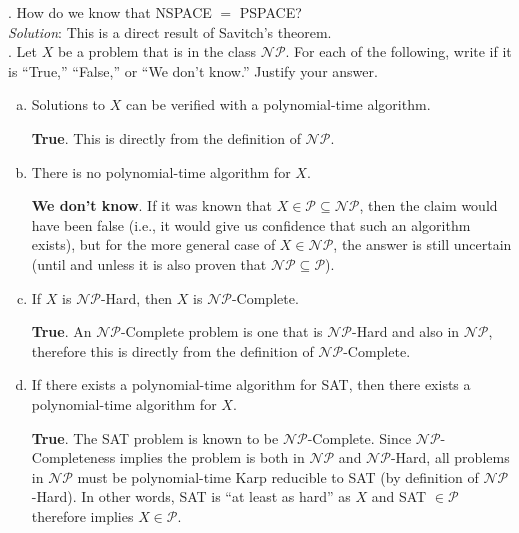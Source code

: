 \documentclass{scrartcl}
\begin{document}
    \bigskip
    . How do we know that \textsf{NSPACE $=$ PSPACE}?\\

    \noindent
    \textit{Solution}: This is a direct result of Savitch's theorem.\\

    \bigskip
    . Let $X$ be a problem that is in the class $\mathcal{NP}$. For each of the following, write if
    it is ``True,'' ``False,'' or ``We don't know.'' Justify your answer.
    \begin{enumerate}[(a)]
        \item Solutions to $X$ can be verified with a polynomial-time algorithm.

            \textbf{True}. This is directly from the definition of $\mathcal{NP}$.

        \item There is no polynomial-time algorithm for $X$.

            \textbf{We don't know}. If it was known that $X \in \mathcal{P} \subseteq \mathcal{NP}$,
            then the claim would have been false (i.e., it would give us confidence that such an
            algorithm exists), but for the more general case of $X \in \mathcal{NP}$, the answer is
            still uncertain (until and unless it is also proven that $\mathcal{NP} \subseteq
            \mathcal{P}$).

        \item If $X$ is $\mathcal{NP}$-Hard, then $X$ is $\mathcal{NP}$-Complete.

            \textbf{True}. An $\mathcal{NP}$-Complete problem is one that is $\mathcal{NP}$-Hard and
            also in $\mathcal{NP}$, therefore this is directly from the definition of
            $\mathcal{NP}$-Complete.

        \item If there exists a polynomial-time algorithm for SAT, then there exists a
            polynomial-time algorithm for $X$.

            \textbf{True}. The SAT problem is known to be $\mathcal{NP}$-Complete. Since
            $\mathcal{NP}$-Completeness implies the problem is both in $\mathcal{NP}$ and
            $\mathcal{NP}$-Hard, all problems in $\mathcal{NP}$ must be polynomial-time Karp
            reducible to SAT (by definition of $\mathcal{NP}$-Hard). In other words, SAT is ``at
            least as hard'' as $X$ and SAT $\in \mathcal{P}$ therefore implies $X \in \mathcal{P}$.
    \end{enumerate}
\end{document}
